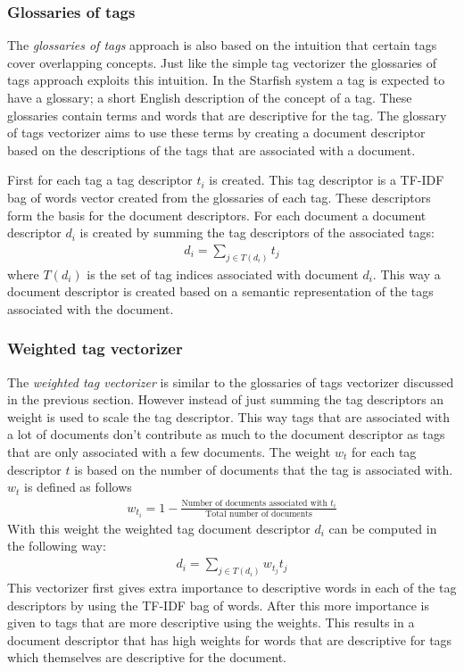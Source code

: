 \subsubsection{Glossaries of tags}
The \emph{glossaries of tags} approach is also based on the intuition that certain
tags cover overlapping concepts. Just like the simple tag vectorizer the
glossaries of tags approach exploits this intuition. In the Starfish system a
tag is expected to have a glossary; a short English description of the concept
of a tag. These glossaries contain terms and words that are descriptive for the
tag. The glossary of tags vectorizer aims to use these terms by creating a
document descriptor based on the descriptions of the tags that are associated 
with a document. 

First for each tag a tag descriptor $t_i$ is created. This tag descriptor is
a TF-IDF bag of words vector created from the glossaries of each tag. These
descriptors form the basis for the document descriptors. For each document
a document descriptor $d_i$ is created by summing the tag descriptors of the
associated tags:
\begin{align}
  d_i = \sum_{j \in T(d_i)} t_j
\end{align}
where $T(d_i)$ is the set of tag indices associated with document $d_i$. This
way a document descriptor is created based on a semantic representation of
the tags associated with the document.

\subsubsection{Weighted tag vectorizer}
The \emph{weighted tag vectorizer} is similar to the glossaries of tags vectorizer
discussed in the previous section. However instead of just summing the tag
descriptors an weight is used to scale the tag descriptor. This way tags that
are associated with a lot of documents don't contribute as much to the document
descriptor as tags that are only associated with a few documents. The weight
$w_t$ for each tag descriptor $t$ is based on the number of documents that the
tag is associated with. $w_t$ is defined as follows
\begin{align}
  w_{t_i} = 1 - \frac{\textrm{Number of documents associated with $t_i$}}{\textrm{Total number of documents}}
\end{align}
With this weight the weighted tag document descriptor $d_i$ can be computed
in the following way:
\begin{align}
  d_i = \sum_{j \in T(d_i)} w_{t_j}t_j
\end{align}
This vectorizer first gives extra importance to descriptive words in each of
the tag descriptors by using the TF-IDF bag of words. After this more
importance is given to tags that are more descriptive using the weights. This
results in a document descriptor that has high weights for words that are
descriptive for tags which themselves are descriptive for the document.

